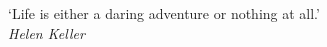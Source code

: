 
\clearpage

\narrowlinespacing

\vspace*{4mm}
\vspace*{\fill}
`Life is either a daring adventure or nothing at all.'
\\
\hfill\emph{Helen Keller}
\vspace*{\fill}

\normallinespacing

